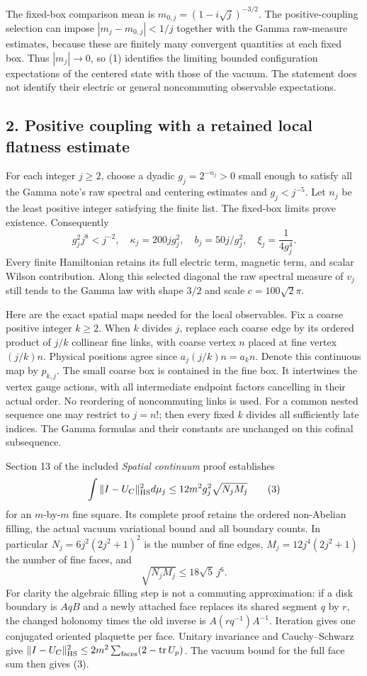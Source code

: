 \documentclass[
  11pt,
]{article}
\begin{document}
The fixed-box comparison mean is \(m_{0,j}=(1-i\sqrt j)^{-3/2}\). The
positive-coupling selection can impose \(|m_j-m_{0,j}|<1/j\) together
with the Gamma raw-measure estimates, because these are finitely many
convergent quantities at each fixed box. Thus \(|m_j|\to0\), so (1)
identifies the limiting bounded configuration expectations of the
centered state with those of the vacuum. The statement does not identify
their electric or general noncommuting observable expectations.

\subsection{2. Positive coupling with a retained local flatness
estimate}\label{weak-coupling-part-6-positive-coupling-with-a-retained-local-flatness-estimate}

For each integer \(j\ge2\), choose a dyadic \(g_j=2^{-n_j}>0\) small
enough to satisfy all the Gamma note's raw spectral and centering
estimates and \(g_j<j^{-5}\). Let \(n_j\) be the least positive integer
satisfying the finite list. The fixed-box limits prove existence.
Consequently \[
 g_j^2j^8<j^{-2},\quad
 \kappa_j=200jg_j^2,\quad b_j=50j/g_j^2,\quad
 \xi_j=\frac1{4g_j^4}.
 \tag{2}
\] Every finite Hamiltonian retains its full electric term, magnetic
term, and scalar Wilson contribution. Along this selected diagonal the
raw spectral measure of \(v_j\) still tends to the Gamma law with shape
\(3/2\) and scale \(c=100\sqrt2\pi\).

Here are the exact spatial maps needed for the local observables. Fix a
coarse positive integer \(k\ge2\). When \(k\) divides \(j\), replace
each coarse edge by its ordered product of \(j/k\) collinear fine links,
with coarse vertex \(n\) placed at fine vertex \((j/k)n\). Physical
positions agree since \(a_j(j/k)n=a_kn\). Denote this continuous map by
\(p_{k,j}\). The small coarse box is contained in the fine box. It
intertwines the vertex gauge actions, with all intermediate endpoint
factors cancelling in their actual order. No reordering of noncommuting
links is used. For a common nested sequence one may restrict to
\(j=n!\); then every fixed \(k\) divides all sufficiently late indices.
The Gamma formulas and their constants are unchanged on this cofinal
subsequence.

Section 13 of the included \emph{Spatial continuum} proof establishes \[
 \int \|I-U_C\|_{\rm HS}^2d\mu_j
 \le 12m^2g_j^2\sqrt{N_jM_j}
 \tag{3}
\] for an \(m\)-by-\(m\) fine square. Its complete proof retains the
ordered non-Abelian filling, the actual vacuum variational bound and all
boundary counts. In particular \(N_j=6j^2(2j^2+1)^2\) is the number of
fine edges, \(M_j=12j^4(2j^2+1)\) the number of fine faces, and \[
 \sqrt{N_jM_j}\le18\sqrt5\,j^6.
\] For clarity the algebraic filling step is not a commuting
approximation: if a disk boundary is \(AqB\) and a newly attached face
replaces its shared segment \(q\) by \(r\), the changed holonomy times
the old inverse is \(A(rq^{-1})A^{-1}\). Iteration gives one conjugated
oriented plaquette per face. Unitary invariance and Cauchy--Schwarz give
\(\|I-U_C\|_{\rm HS}^2\le2m^2\sum_{\text{faces}}(2-\operatorname{tr}U_p)\).
The vacuum bound for the full face sum then gives (3).
\end{document}
